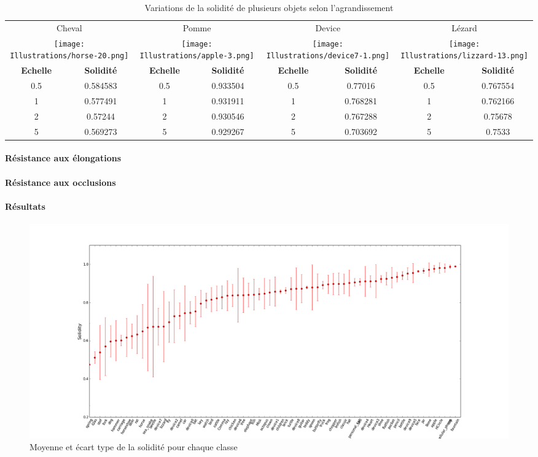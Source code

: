 \documentclass{article}
\begin{document}
	  \begin{table}
	  \centering
	  \begin{tabular}{|c|c|c|c|c|c|c|c|}
	    \hline
	    \multicolumn{2}{|c|}{Cheval} & \multicolumn{2}{|c|}{Pomme} & \multicolumn{2}{|c|}{Device} & \multicolumn{2}{|c|}{Lézard} \\
	    \multicolumn{2}{|c|}{\texttt{[image: Illustrations/horse-20.png]}} 
	    & \multicolumn{2}{|c|}{\texttt{[image: Illustrations/apple-3.png]}} 
	    & \multicolumn{2}{|c|}{\texttt{[image: Illustrations/device7-1.png]}} 
	    & \multicolumn{2}{|c|}{\texttt{[image: Illustrations/lizzard-13.png]}} \\
	    \hline
	    \textbf{Echelle} & \textbf{Solidité} & \textbf{Echelle} & \textbf{Solidité} & \textbf{Echelle} & \textbf{Solidité} & \textbf{Echelle} & \textbf{Solidité} \\
	    \hline
	    0.5 & 0.584583 & 0.5 & 0.933504 & 0.5 & 0.77016 & 0.5 & 0.767554 \\
	    \hline
	    1 & 0.577491 & 1 & 0.931911 & 1 & 0.768281 & 1 & 0.762166 \\
	    \hline
	    2 & 0.57244 & 2 & 0.930546 & 2 & 0.767288 & 2 & 0.75678 \\
	    \hline
	    5 & 0.569273 & 5 & 0.929267 & 5 & 0.703692 & 5 & 0.7533 \\
	    \hline
	  \end{tabular}
	  \caption{Variations de la solidité de plusieurs objets selon l'agrandissement}
	  \label{solidité-scaling-table}
	  \end{table}
	  
	\paragraph{Résistance aux élongations}
	
	\paragraph{Résistance aux occlusions}
	  
	\paragraph{Résultats}
	
	  \begin{figure}[!h]
	    \begin{bigcenter}
	      \includegraphics[scale=0.38]{Graphes/solidite.png}
	    \end{bigcenter}
	    \caption{Moyenne et écart type de la solidité pour chaque classe}
	    \label{solidité}
	  \end{figure}
\end{document}
